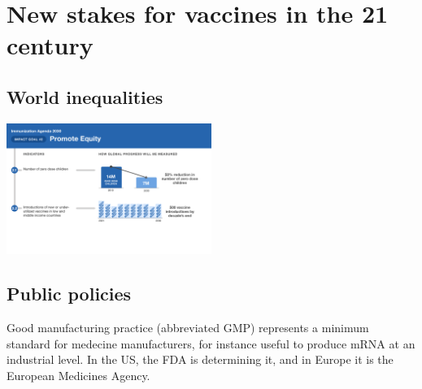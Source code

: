 \documentclass{article}
\begin{document}




        

    \section{New stakes for vaccines in the 21 century}

        \subsection{World inequalities}



        
        \begin{center}
            \includegraphics[width=0.5\textwidth]{imgs/IA2030_Scorecard_May23-3.png}
        \end{center}

        \subsection{Public policies}

            Good manufacturing practice (abbreviated GMP) represents a minimum standard for medecine manufacturers,
                for instance useful to produce mRNA at an industrial level. In the US, the FDA is determining it, and in Europe
                it is the European Medicines Agency.
\end{document}
